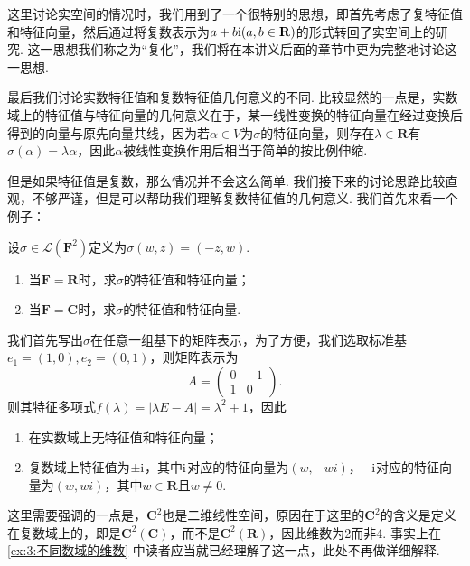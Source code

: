 这里讨论实空间的情况时，我们用到了一个很特别的思想，即首先考虑了复特征值和特征向量，然后通过将复数表示为$a+b\textup{i}(a,b\in\mathbf{R})$的形式转回了实空间上的研究. 这一思想我们称之为``复化''，我们将在本讲义后面的章节中更为完整地讨论这一思想.

最后我们讨论实数特征值和复数特征值几何意义的不同. 比较显然的一点是，实数域上的特征值与特征向量的几何意义在于，某一线性变换的特征向量在经过变换后得到的向量与原先向量共线，因为若$\alpha\in V$为$\sigma$的特征向量，则存在$\lambda\in\mathbf{R}$有$\sigma(\alpha)=\lambda\alpha$，因此$\alpha$被线性变换作用后相当于简单的按比例伸缩.

但是如果特征值是复数，那么情况并不会这么简单. 我们接下来的讨论思路比较直观，不够严谨，但是可以帮助我们理解复数特征值的几何意义. 我们首先来看一个例子：
\begin{example}
    设$\sigma\in\mathcal{L}(\mathbf{F}^2)$定义为$\sigma(w,z)=(-z,w)$.
    \begin{enumerate}
        \item 当$\mathbf{F}=\mathbf{R}$时，求$\sigma$的特征值和特征向量；

        \item 当$\mathbf{F}=\mathbf{C}$时，求$\sigma$的特征值和特征向量.
    \end{enumerate}
\end{example}

\begin{solution}
    我们首先写出$\sigma$在任意一组基下的矩阵表示，为了方便，我们选取标准基$e_1=(1,0),e_2=(0,1)$，则矩阵表示为
    \[ A=\begin{pmatrix}
            0 & -1 \\ 1 & 0
        \end{pmatrix}. \]
    则其特征多项式$f(\lambda)=|\lambda E-A|=\lambda^2+1$，因此
    \begin{enumerate}
        \item 在实数域上无特征值和特征向量；

        \item 复数域上特征值为$\pm\textup{i}$，其中$\textup{i}$对应的特征向量为$(w,-wi)$，$-\textup{i}$对应的特征向量为$(w,wi)$，其中$w\in\mathbf{R}$且$w\neq 0$.
    \end{enumerate}
\end{solution}

这里需要强调的一点是，$\mathbf{C}^2$也是二维线性空间，原因在于这里的$\mathbf{C}^2$的含义是定义在复数域上的，即是$\mathbf{C}^2(\mathbf{C})$，而不是$\mathbf{C}^2(\mathbf{R})$，因此维数为2而非4. 事实上在\autoref{ex:3:不同数域的维数} 中读者应当就已经理解了这一点，此处不再做详细解释.

